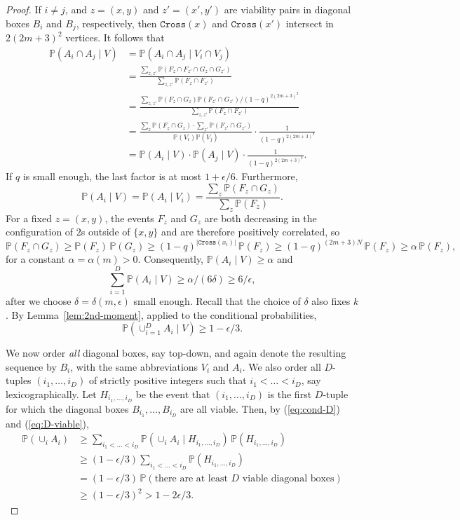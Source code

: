 \documentclass{article}
\renewcommand{\P}{\mathbb{P}}
\numberwithin{equation}{section}
\begin{document}
\begin{proof}
If $i\ne j$, and $z=(x,y)$ and $z'=(x',y')$ are viability pairs in
diagonal boxes $B_i$ and $B_j$, respectively, then 
$\texttt{Cross}(x)$ and $\texttt{Cross}(x')$ intersect in $2(2m+3)^2$
vertices. It follows that 
\begin{equation*}
\begin{aligned}
\P(A_i\cap A_j\mid V)&=\P(A_i\cap A_j\mid V_i\cap V_j)
\\&=
\frac{\sum_{z,z'}\P(F_z\cap F_{z'}\cap G_z\cap G_{z'})}{\sum_{z,z'}\P(F_z\cap F_{z'})}
\\&=
\frac{\sum_{z,z'}\P(F_z\cap G_{z})\P(F_{z'}\cap G_{z'})/(1-q)^{2(2m+3)^2}}{\sum_{z,z'}\P(F_z\cap F_{z'})}
\\&=
\frac{\sum_{z}\P(F_z\cap G_{z})\cdot \sum_{z'}\P(F_{z'}\cap G_{z'})}{\P(V_i)\P(V_j)}\cdot \frac 1{(1-q)^{2(2m+3)^2}}
\\&=
\P(A_i\mid V)\cdot \P(A_j\mid V)
\cdot \frac 1{(1-q)^{2(2m+3)^2}}.
\end{aligned}
\end{equation*}
If $q$ is small enough, the last factor is at most $1+\epsilon/6$. 
Furthermore, 
$$
\P(A_i\mid V)=\P(A_i\mid V_i)
=\frac{\sum_z \P(F_z\cap G_z)}{\sum_z \P(F_z)}.
$$
For a fixed $z=(x,y)$, the events $F_z$ and $G_z$ are both 
decreasing in the configuration of $2$s outside of $\{x,y\}$ and are therefore 
positively correlated, so 
$$ 
\P(F_z\cap G_z)\ge \P(F_z)\,\P(G_z)\ge (1-q)^{|\texttt{Cross}(x_i)|}\, \P(F_z)
\ge  (1-q)^{(2m+3)N}\, \P(F_z)\ge \alpha\,  \P(F_z), 
$$
for a constant $\alpha=\alpha(m)>0$. Consequently, 
$\P(A_i\mid V)\ge \alpha$ and 
$$
\sum_{i=1}^D \P(A_i\mid V)\ge \alpha/(6\delta)\ge 6/\epsilon,
$$
after we choose $\delta=\delta(m, \epsilon)$ small enough. 
Recall that the choice of $\delta$ also fixes $k$. 
By 
Lemma~\ref{lem:2nd-moment}, applied to the conditional probabilities,
\begin{equation}\label{eq:cond-D}
\P(\cup_{i=1}^D A_i\mid V)\ge 1-\epsilon/3.
\end{equation}

We now order {\it all\/} diagonal boxes, say top-down, and again denote 
the resulting sequence by $B_i$, with the same abbreviations
$V_i$ and $A_i$. We also order all $D$-tuples $(i_1,\ldots, i_D)$
of strictly positive integers such that $i_1<\ldots<i_D$, say lexicographically.
Let $H_{i_1,\ldots, i_D}$ be the event that $(i_1,\ldots, i_D)$ is the first $D$-tuple for which the diagonal boxes 
$B_{i_1},\ldots, B_{i_D}$ are all viable. Then, by (\ref{eq:cond-D}) and 
(\ref{eq:D-viable}),
\begin{equation}\label{eq:union-A}
\begin{aligned}
    \P(\cup_i A_i)&\ge \sum_{i_1<\ldots <i_D} \P(\cup_i A_i
\mid H_{i_1,\ldots, i_D})\,\P(H_{i_1,\ldots, i_D})\\
&\ge (1-\epsilon/3) \sum_{i_1<\ldots <i_D}\P(H_{i_1,\ldots, i_D})\\
&= (1-\epsilon/3)\,\P(\text{there are at least $D$ viable diagonal boxes})\\
&\ge (1-\epsilon/3)^2>1-2\epsilon/3.
\end{aligned}
\end{equation}


\end{proof}
\end{document}
